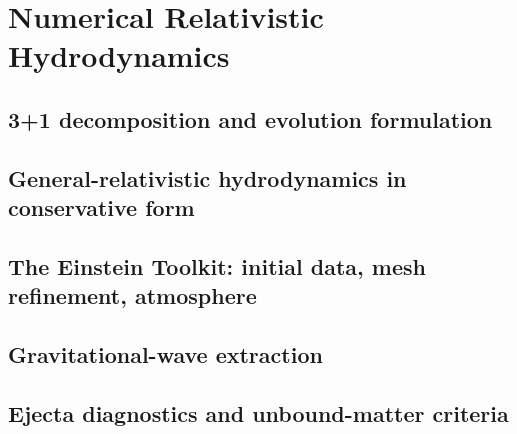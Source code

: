 

\chapter{Numerical Relativistic Hydrodynamics}\label{ch:GR}

\section[3+1 decomposition and evolution formulation]{3+1 decomposition and evolution formulation}
\section[General-relativistic hydrodynamics in conservative form]{General-relativistic hydrodynamics in conservative form}
\section[The Einstein Toolkit: initial data, mesh refinement, atmosphere]{The Einstein Toolkit: initial data, mesh refinement, atmosphere}
\section[Gravitational-wave extraction]{Gravitational-wave extraction}
\section[Ejecta diagnostics and unbound-matter criteria]{Ejecta diagnostics and unbound-matter criteria}







